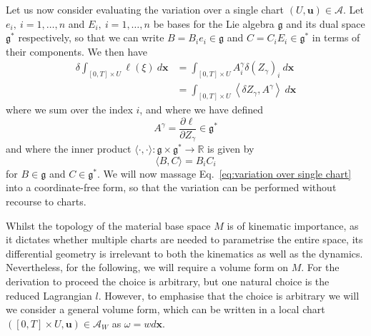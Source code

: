 Let us now consider evaluating the variation over a single chart $(U, \mathbf{u}) \in \mathcal{A}$. Let $e_i,\ i=1,\dots,n$ and $E_i,\ i=1,\dots, n$ be bases for the Lie algebra $\mathfrak{g}$ and its dual space $\mathfrak{g}^*$ respectively, so that we can write $B = B_i e_i \in \mathfrak{g}$ and $C = C_i E_i \in \mathfrak{g}^*$ in terms of their components. We then have
\begin{equation}  \label{eq:variation over single chart}
\begin{aligned}
\delta \int_{[0, T] \times U} \ell(\xi)\  d\mathbf{x} & =
\int_{[0, T] \times U} A^\gamma_i \delta (Z_\gamma)_i\ d\mathbf{x} \\
& = \int_{[0, T] \times U} \left\langle \delta Z_\gamma, A^\gamma \right\rangle\  d\mathbf{x}
\end{aligned}
\end{equation}
where we sum over the index $i$, and where we have defined
\begin{equation}
A^\gamma = \frac{\partial \ell}{\partial Z_\gamma} \in \mathfrak{g}^*
\end{equation}
and where the inner product $\langle \cdot , \cdot \rangle : \mathfrak{g} \times \mathfrak{g}^* \to \mathbb{R}$ is given by
\begin{equation}
\langle B, C \rangle = B_i C_i
\end{equation}
for $B \in \mathfrak{g}$ and $C \in \mathfrak{g}^*$. We will now massage Eq.~\ref{eq:variation over single chart} into a coordinate-free form, so that the variation can be performed without recourse to charts.


Whilst the topology of the material base space $M$ is of kinematic importance, as it dictates whether multiple charts are needed to parametrise the entire space, its differential geometry is irrelevant to both the kinematics as well as the dynamics. Nevertheless, for the following, we will require a volume form on $M$. For the derivation to proceed the choice is arbitrary, but one natural choice is the reduced Lagrangian $l$. However, to emphasise that the choice is arbitrary we will we consider a general volume form, which can be written in a local chart $([0,T] \times U, \mathbf{u}) \in \mathcal{A}_W$ as $\omega = w d \mathbf{x}$.

